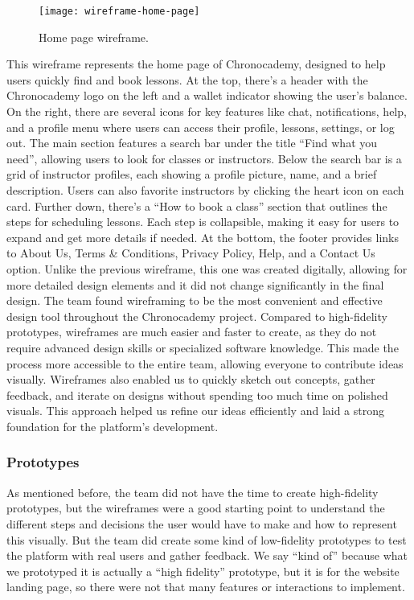 \begin{figure}[h]
    \centering
    \texttt{[image: wireframe-home-page]}
    \caption{Home page wireframe.}
    \label{fig:figure22}
\end{figure}
This wireframe represents the home page of Chronocademy, designed to help users quickly find and book lessons.
At the top, there’s a header with the Chronocademy logo on the left and a wallet indicator showing the user's balance.
On the right, there are several icons for key features like chat, notifications, help, and a profile menu where users can access their profile, lessons, settings, or log out.
The main section features a search bar under the title ``Find what you need'', allowing users to look for classes or instructors.
Below the search bar is a grid of instructor profiles, each showing a profile picture, name, and a brief description.
Users can also favorite instructors by clicking the heart icon on each card.
Further down, there’s a ``How to book a class'' section that outlines the steps for scheduling lessons.
Each step is collapsible, making it easy for users to expand and get more details if needed.
At the bottom, the footer provides links to About Us, Terms \& Conditions, Privacy Policy, Help, and a Contact Us option.
Unlike the previous wireframe, this one was created digitally, allowing for more detailed design elements and it did not change significantly in the final design.\newline
\indent The team found wireframing to be the most convenient and effective design tool throughout the Chronocademy project.
Compared to high-fidelity prototypes, wireframes are much easier and faster to create, as they do not require advanced design skills or specialized software knowledge.
This made the process more accessible to the entire team, allowing everyone to contribute ideas visually.
Wireframes also enabled us to quickly sketch out concepts, gather feedback, and iterate on designs without spending too much time on polished visuals.
This approach helped us refine our ideas efficiently and laid a strong foundation for the platform’s development.

\subsubsection{Prototypes}\label{subsubsec:prototypes}
As mentioned before, the team did not have the time to create high-fidelity prototypes, but the wireframes were a good starting point to understand the different steps and decisions the user would have to make and how to represent this visually.
But the team did create some kind of low-fidelity prototypes to test the platform with real users and gather feedback.
We say ``kind of'' because what we prototyped it is actually a ``high fidelity'' prototype, but it is for the website landing page, so there were not that many features or interactions to implement.

